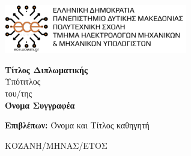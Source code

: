 \begin{titlepage}
 \includegraphics[width=0.6\textwidth]{images/logo}

    \begin{center}
        \vspace*{3cm}
            
        \Huge
        \color{orange}
        \textbf{Τίτλος Διπλωματικής}\\
        \color{black}  
        \vspace{0.5cm}
        \LARGE
        Υπότιτλος\\
        \vspace{0.5cm}
        \small
        του/της\\
            
        \vspace{1.5cm}
        \LARGE    
        \textbf{Όνομα Συγγραφέα}
            
         \vspace{3.5cm}
        \textbf{Επιβλέπων:} Όνομα και Τίτλος καθηγητή
        \vfill    
        \vspace{0.8cm}
            
       
            
        \Large
       ΚΟΖΑΝΗ/ΜΗΝΑΣ/ΕΤΟΣ
       \end{center}
\end{titlepage}